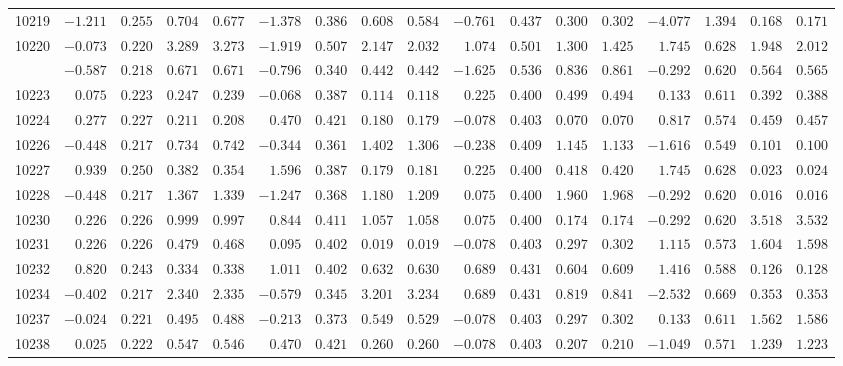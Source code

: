 \documentclass[6pt]{article}
\begin{document}
\begin{landscape}
{\begin{longtable}{lrrrrrrrrrrrrrrrr}
10219&$-1.211$&$0.255$&$0.704$&$0.677$&$-1.378$&$0.386$&$0.608$&$0.584$&$-0.761$&$0.437$&$0.300$&$0.302$&$-4.077$&$1.394$&$0.168$&$0.171$\tabularnewline
10220&$-0.073$&$0.220$&$3.289$&$3.273$&$-1.919$&$0.507$&$2.147$&$2.032$&$ 1.074$&$0.501$&$1.300$&$1.425$&$ 1.745$&$0.628$&$1.948$&$2.012$\tabularnewline
\newpage
10221&$-0.587$&$0.218$&$0.671$&$0.671$&$-0.796$&$0.340$&$0.442$&$0.442$&$-1.625$&$0.536$&$0.836$&$0.861$&$-0.292$&$0.620$&$0.564$&$0.565$\tabularnewline
10223&$ 0.075$&$0.223$&$0.247$&$0.239$&$-0.068$&$0.387$&$0.114$&$0.118$&$ 0.225$&$0.400$&$0.499$&$0.494$&$ 0.133$&$0.611$&$0.392$&$0.388$\tabularnewline
10224&$ 0.277$&$0.227$&$0.211$&$0.208$&$ 0.470$&$0.421$&$0.180$&$0.179$&$-0.078$&$0.403$&$0.070$&$0.070$&$ 0.817$&$0.574$&$0.459$&$0.457$\tabularnewline
10226&$-0.448$&$0.217$&$0.734$&$0.742$&$-0.344$&$0.361$&$1.402$&$1.306$&$-0.238$&$0.409$&$1.145$&$1.133$&$-1.616$&$0.549$&$0.101$&$0.100$\tabularnewline
10227&$ 0.939$&$0.250$&$0.382$&$0.354$&$ 1.596$&$0.387$&$0.179$&$0.181$&$ 0.225$&$0.400$&$0.418$&$0.420$&$ 1.745$&$0.628$&$0.023$&$0.024$\tabularnewline
10228&$-0.448$&$0.217$&$1.367$&$1.339$&$-1.247$&$0.368$&$1.180$&$1.209$&$ 0.075$&$0.400$&$1.960$&$1.968$&$-0.292$&$0.620$&$0.016$&$0.016$\tabularnewline
10230&$ 0.226$&$0.226$&$0.999$&$0.997$&$ 0.844$&$0.411$&$1.057$&$1.058$&$ 0.075$&$0.400$&$0.174$&$0.174$&$-0.292$&$0.620$&$3.518$&$3.532$\tabularnewline
10231&$ 0.226$&$0.226$&$0.479$&$0.468$&$ 0.095$&$0.402$&$0.019$&$0.019$&$-0.078$&$0.403$&$0.297$&$0.302$&$ 1.115$&$0.573$&$1.604$&$1.598$\tabularnewline
10232&$ 0.820$&$0.243$&$0.334$&$0.338$&$ 1.011$&$0.402$&$0.632$&$0.630$&$ 0.689$&$0.431$&$0.604$&$0.609$&$ 1.416$&$0.588$&$0.126$&$0.128$\tabularnewline
10234&$-0.402$&$0.217$&$2.340$&$2.335$&$-0.579$&$0.345$&$3.201$&$3.234$&$ 0.689$&$0.431$&$0.819$&$0.841$&$-2.532$&$0.669$&$0.353$&$0.353$\tabularnewline
10237&$-0.024$&$0.221$&$0.495$&$0.488$&$-0.213$&$0.373$&$0.549$&$0.529$&$-0.078$&$0.403$&$0.297$&$0.302$&$ 0.133$&$0.611$&$1.562$&$1.586$\tabularnewline
10238&$ 0.025$&$0.222$&$0.547$&$0.546$&$ 0.470$&$0.421$&$0.260$&$0.260$&$-0.078$&$0.403$&$0.207$&$0.210$&$-1.049$&$0.571$&$1.239$&$1.223$\tabularnewline
\hline
\end{longtable}}\end{landscape}
\end{document}

